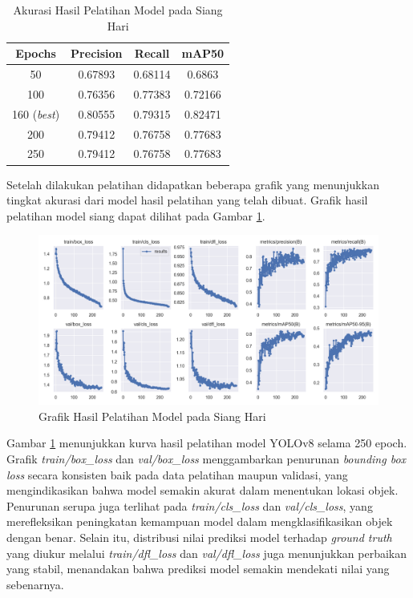 \begin{table}[H]
	\caption{Akurasi Hasil Pelatihan Model pada Siang Hari}
    \label{table:akurasi model siang}
	\centering
	\begin{tabular}{|c|c|c|c|}
		\hline
		Epochs & Precision & Recall & mAP50 \\ \hline
		50 & 0.67893 & 0.68114 & 0.6863 \\ \hline
		100 & 0.76356 & 0.77383 & 0.72166  \\ \hline
		160 (\emph{best}) & 0.80555 & 0.79315 & 0.82471  \\ \hline
		200 & 0.79412 & 0.76758 & 0.77683 \\ \hline
		250 & 0.79412 & 0.76758 & 0.77683 \\ \hline
	\end{tabular}
\end{table}

Setelah dilakukan pelatihan didapatkan beberapa grafik yang menunjukkan tingkat akurasi dari model hasil pelatihan yang telah dibuat. Grafik hasil pelatihan model siang dapat dilihat pada Gambar \ref{fig:grafik model siang}.
\vspace{-3ex}
\begin{figure} [H] \centering
  \includegraphics[scale=0.5]{bab4/results_siang.png}
  \caption{Grafik Hasil Pelatihan Model pada Siang Hari}
  \label{fig:grafik model siang}
\end{figure}
\vspace{-5ex}
Gambar \ref{fig:grafik model siang} menunjukkan kurva hasil pelatihan model YOLOv8 selama 250 epoch. Grafik \emph{train/box\_loss} dan \emph{val/box\_loss} menggambarkan penurunan \emph{bounding box loss} secara konsisten baik pada data pelatihan maupun validasi, yang mengindikasikan bahwa model semakin akurat dalam menentukan lokasi objek. Penurunan serupa juga terlihat pada \emph{train/cls\_loss} dan \emph{val/cls\_loss}, yang merefleksikan peningkatan kemampuan model dalam mengklasifikasikan objek dengan benar. Selain itu, distribusi nilai prediksi model terhadap \emph{ground truth} yang diukur melalui \emph{train/dfl\_loss} dan \emph{val/dfl\_loss} juga menunjukkan perbaikan yang stabil, menandakan bahwa prediksi model semakin mendekati nilai yang sebenarnya.

